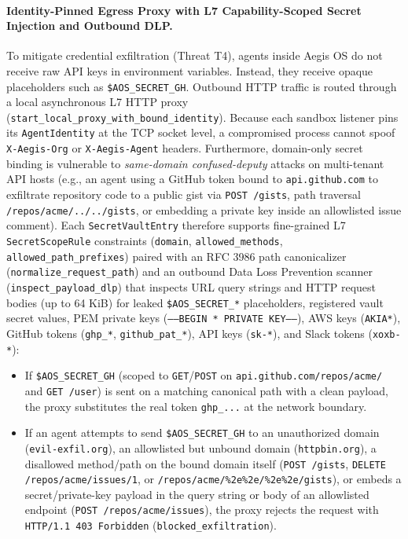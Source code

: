 \documentclass[acmsmall,screen,review]{acmart}
\begin{document}
\paragraph{Identity-Pinned Egress Proxy with L7 Capability-Scoped Secret Injection and Outbound DLP.} To mitigate credential exfiltration (Threat T4), agents inside Aegis OS do not receive raw API keys in environment variables. Instead, they receive opaque placeholders such as \texttt{\$AOS\_SECRET\_GH}. Outbound HTTP traffic is routed through a local asynchronous L7 HTTP proxy (\texttt{start\_local\_proxy\_with\_bound\_identity}). Because each sandbox listener pins its \texttt{AgentIdentity} at the TCP socket level, a compromised process cannot spoof \texttt{X-Aegis-Org} or \texttt{X-Aegis-Agent} headers. Furthermore, domain-only secret binding is vulnerable to \emph{same-domain confused-deputy} attacks on multi-tenant API hosts (e.g., an agent using a GitHub token bound to \texttt{api.github.com} to exfiltrate repository code to a public gist via \texttt{POST /gists}, path traversal \texttt{/repos/acme/../../gists}, or embedding a private key inside an allowlisted issue comment). Each \texttt{SecretVaultEntry} therefore supports fine-grained L7 \texttt{SecretScopeRule} constraints (\texttt{domain}, \texttt{allowed\_methods}, \texttt{allowed\_path\_prefixes}) paired with an RFC 3986 path canonicalizer (\texttt{normalize\_request\_path}) and an outbound Data Loss Prevention scanner (\texttt{inspect\_payload\_dlp}) that inspects URL query strings and HTTP request bodies (up to 64 KiB) for leaked \texttt{\$AOS\_SECRET\_*} placeholders, registered vault secret values, PEM private keys (\texttt{-----BEGIN * PRIVATE KEY-----}), AWS keys (\texttt{AKIA*}), GitHub tokens (\texttt{ghp\_*}, \texttt{github\_pat\_*}), API keys (\texttt{sk-*}), and Slack tokens (\texttt{xoxb-*}):
\begin{itemize}
    \item If \texttt{\$AOS\_SECRET\_GH} (scoped to \texttt{GET}/\texttt{POST} on \texttt{api.github.com/repos/acme/} and \texttt{GET /user}) is sent on a matching canonical path with a clean payload, the proxy substitutes the real token \texttt{ghp\_...} at the network boundary.
    \item If an agent attempts to send \texttt{\$AOS\_SECRET\_GH} to an unauthorized domain (\texttt{evil-exfil.org}), an allowlisted but unbound domain (\texttt{httpbin.org}), a disallowed method/path on the bound domain itself (\texttt{POST /gists}, \texttt{DELETE /repos/acme/issues/1}, or \texttt{/repos/acme/\%2e\%2e/\%2e\%2e/gists}), or embeds a secret/private-key payload in the query string or body of an allowlisted endpoint (\texttt{POST /repos/acme/issues}), the proxy rejects the request with \texttt{HTTP/1.1 403 Forbidden} (\texttt{blocked\_exfiltration}).
\end{itemize}
\end{document}
